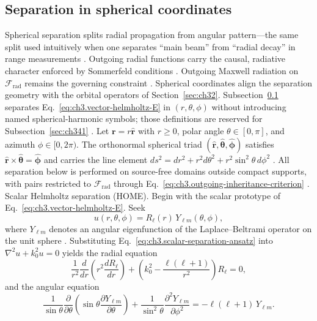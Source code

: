 \subsection{Separation in spherical coordinates}
\label{sec:ch332}
Spherical separation splits radial propagation from angular pattern---the same split used intuitively when one separates ``main beam'' from ``radial decay'' in range measurements \cite{stratton1941}. Outgoing radial functions carry the causal, radiative character enforced by Sommerfeld conditions \cite{harrington2001}. Outgoing Maxwell radiation on $\mathcal{F}_{\mathrm{rad}}$ remains the governing constraint \cite{stratton1941}.
Spherical coordinates align the separation geometry with the orbital operators of Section~\ref{sec:ch32}.
Subsection~\ref{sec:ch332} separates Eq.~\eqref{eq:ch3.vector-helmholtz-E} in \((r,\theta,\phi)\) without
introducing named spherical-harmonic symbols; those definitions are reserved for Subsection~\ref{sec:ch341}
\cite{stratton1941}.
Let \(\mathbf{r}=r\hat{\mathbf{r}}\) with \(r\ge0\), polar angle \(\theta\in[0,\pi]\), and azimuth
\(\phi\in[0,2\pi)\). The orthonormal spherical triad \((\hat{\mathbf{r}},\hat{\boldsymbol{\theta}},\hat{\boldsymbol{\phi}})\)
satisfies \(\hat{\mathbf{r}}\times\hat{\boldsymbol{\theta}}=\hat{\boldsymbol{\phi}}\) and carries the line element
\(ds^{2}=dr^{2}+r^{2}d\theta^{2}+r^{2}\sin^{2}\theta\,d\phi^{2}\) \cite{jackson1999}. All separation below is
performed on source-free domains outside compact supports, with pairs restricted to
\(\mathcal{F}_{\mathrm{rad}}\) through Eq.~\eqref{eq:ch3.outgoing-inheritance-criterion}
\cite{stratton1941}.
Scalar Helmholtz separation (HOME). Begin with the scalar prototype of Eq.~\eqref{eq:ch3.vector-helmholtz-E}. Seek
\begin{equation}
\label{eq:ch3.scalar-separation-ansatz}
u(r,\theta,\phi)=R_{\ell}(r)\,Y_{\ell m}(\theta,\phi),
\end{equation}
where \(Y_{\ell m}\) denotes an angular eigenfunction of the Laplace--Beltrami operator on the unit sphere
\cite{stratton1941}. Substituting Eq.~\eqref{eq:ch3.scalar-separation-ansatz} into
\(\nabla^{2}u+k_{0}^{2}u=0\) yields the radial equation
\begin{equation}
\label{eq:ch3.radial-helmholtz-ODE}
\frac{1}{r^{2}}\frac{d}{dr}\!\left(r^{2}\frac{dR_{\ell}}{dr}\right)
+\left(k_{0}^{2}-\frac{\ell(\ell+1)}{r^{2}}\right)R_{\ell}=0,
\end{equation}
and the angular equation
\begin{equation}
\label{eq:ch3.angular-laplacian-eigenvalue}
\frac{1}{\sin\theta}\frac{\partial}{\partial\theta}
\!\left(\sin\theta\frac{\partial Y_{\ell m}}{\partial\theta}\right)
+\frac{1}{\sin^{2}\theta}\frac{\partial^{2}Y_{\ell m}}{\partial\phi^{2}}
=-\ell(\ell+1)\,Y_{\ell m}.
\end{equation}
